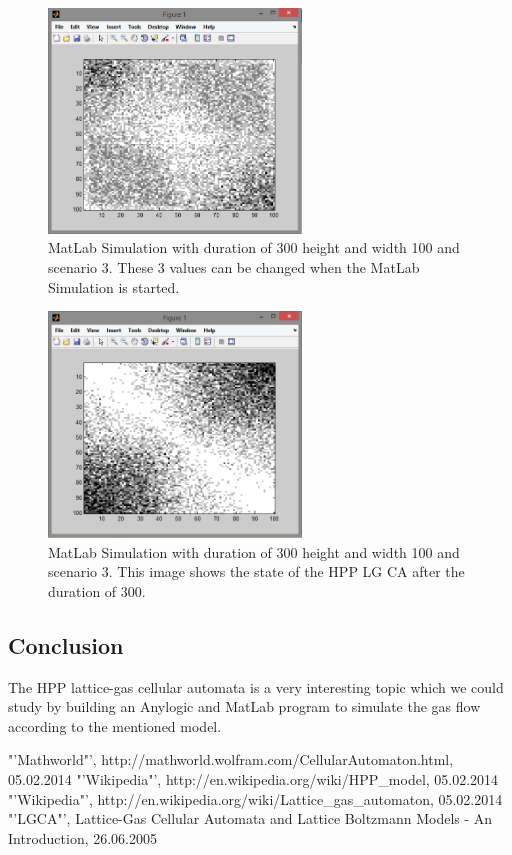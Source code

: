 \documentclass[paper=a4, fontsize=11pt]{scrartcl} %
\numberwithin{equation}{section} %
\numberwithin{figure}{section} %
\numberwithin{table}{section} %
\begin{document}
\begin{figure}[!htp]
	\centering
		\includegraphics[width=0.60\textwidth]{Screenshots/MatLab-300-100-100-3-Start.PNG}
	\caption[MatLab Example 1 - Start]{MatLab Simulation with duration of 300 height and width 100 and scenario 3. These 3 values can be changed when the MatLab Simulation is started.}
	\label{fig:matlab-example1-start}
\end{figure}

\begin{figure}[!htp]
	\centering
		\includegraphics[width=0.60\textwidth]{Screenshots/MatLab-300-100-100-3-End.PNG}
	\caption[MatLab Example 1 - End]{MatLab Simulation with duration of 300 height and width 100 and scenario 3. This image shows the state of the HPP LG CA after the duration of 300.}
	\label{fig:matlab-example1-end}
\end{figure}

\subsection{Conclusion}
The HPP lattice-gas cellular automata is a very interesting topic which we could study by building an Anylogic and MatLab program to simulate the gas flow according to the mentioned model.


\begin{thebibliography}{xxxxxxxxxxxxxxxxxxxxxxxxx}
   "'Mathworld"', http://mathworld.wolfram.com/CellularAutomaton.html, 05.02.2014
   "'Wikipedia"', http://en.wikipedia.org/wiki/HPP\_model, 05.02.2014
   "'Wikipedia"', http://en.wikipedia.org/wiki/Lattice\_gas\_automaton, 05.02.2014
   "'LGCA"', Lattice-Gas Cellular
Automata and
Lattice Boltzmann Models
- An Introduction, 26.06.2005
\end{thebibliography}
\end{document}
